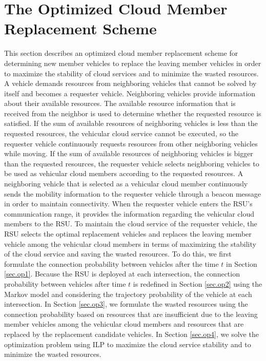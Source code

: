 \documentclass[electronics,aricle,accept,pdftex,moreauthors]{Definitions/mdpi}
\begin{document}
\section{The Optimized Cloud Member Replacement Scheme} \label{sec.op}
This section describes an optimized cloud member replacement scheme for determining new member vehicles to replace the leaving member vehicles in order to maximize the stability of cloud services and to minimize the wasted resources.
A vehicle demands resources from neighboring vehicles that cannot be solved by itself and becomes a requester vehicle.
Neighboring vehicles provide information about their available resources.
The available resource information that is received from the neighbor is used to determine whether the requested resource is satisfied.
If the sum of available resources of neighboring vehicles is less than the requested resources, the vehicular cloud service cannot be executed, so the requester vehicle continuously requests resources from other neighboring vehicles while moving.
If the sum of available resources of neighboring vehicles is bigger than the requested resources, the requester vehicle selects neighboring vehicles to be used as vehicular cloud members according to the requested resources.
A neighboring vehicle that is selected as a vehicular cloud member continuously sends the mobility information to the requester vehicle through a beacon message in order to maintain connectivity.
When the requester vehicle enters the RSU's communication range, it provides the information regarding the vehicular cloud members to the RSU.
To maintain the cloud service of the requester vehicle, the RSU selects the optimal replacement vehicles and replaces the leaving member vehicle among the vehicular cloud members in terms of maximizing the stability of the cloud service and saving the wasted resources.
To do this, we first formulate the connection probability between vehicles after the time $t$ in Section \ref{sec.op1}.
Because the RSU is deployed at each intersection, the connection probability between vehicles after time $t$ is redefined in Section \ref{sec.op2} using the Markov model and considering the trajectory probability of the vehicle at each intersection.
In Section \ref{sec.op3}, we formulate the wasted resources using the connection probability based on resources that are insufficient due to the leaving member vehicles among the vehicular cloud members and resources that are replaced by the replacement candidate vehicles.
In Section \ref{sec.op4}, we solve the optimization problem using ILP to maximize the cloud service stability and to minimize the wasted resources.
\end{document}
